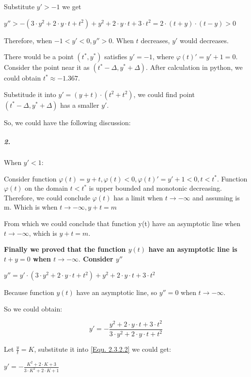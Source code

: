 \documentclass[11pt,a4paper]{article}
\begin{document}
	Substitute $y'>-1$ we get
	
	\begin{center}
		$y''> -(3\cdot y^2+2\cdot y \cdot t + t^2)+y^2+2\cdot y \cdot t + 3\cdot t^2 = 2 \cdot (t+y)\cdot (t-y)>0$
	\end{center}

	Therefore, when $-1<y'<0, y'' > 0$. When $t$ decreases, $y'$ would decreases. 
	
	There would be a point $(t^*, y^*)$ satisfies $y'=-1$, where $\varphi(t)'=y'+1=0$. Consider the point near it as $(t^*-\Delta, y^*+\Delta)$. After calculation in python, we could obtain $t^* \approx -1.367$.
	
	Substitude it into $y'=(y+t)\cdot(t^2+t^2)$, we could find point $(t^*-\Delta, y^*+\Delta)$ has a smaller $y'$.
	
	So, we could have the following discussion:
	
	\subparagraph{2.} When $y' < 1$:
	
	Consider function $\varphi(t)=y+t, \varphi(t)<0, \varphi(t)'=y'+1<0, t<t^*$.
	Function $\varphi(t)$ on the domain $t<t^*$ is upper bounded and monotonic decreasing. Therefore, we could conclude $\varphi(t)$ has a limit when $t \rightarrow -\infty$ and assuming is m.
	Which is when $t \rightarrow -\infty, y+t=m$
	
	From which we could conclude that function y(t) have an asymptotic line when $t\rightarrow -\infty$, which is $y+t=m$.
	
	\textbf{Finally we proved that the function $y(t)$ have an asymptotic line is $t+y=0$ when $t\rightarrow -\infty.$ Consider $y''$}
	
	\begin{center}
		$y''=y'\cdot(3\cdot y^2+2\cdot y \cdot t+t^2)+y^2+2\cdot y \cdot t + 3\cdot t^2$
	\end{center}
	
	Because function $y(t)$ have an asymptotic line, so $y''=0$ when $t\rightarrow -\infty$.
	
	So we could obtain:
	
	\begin{equation}
		y' = -\frac{y^2+2\cdot y \cdot t + 3\cdot t^2}{3\cdot y^2+2\cdot y \cdot t + t^2} \tag{Equ 2.3.2.2} \label{Equ. 2.3.2.2}
	\end{equation}

	Let $\frac{y}{t}=K$, substitute it into \ref{Equ. 2.3.2.2} we could get:
	
	\begin{center}
		$y' = -\frac{K^2+2\cdot K+3}{3\cdot K^2+ 2\cdot K +1}$
	\end{center}
	
\end{document}
